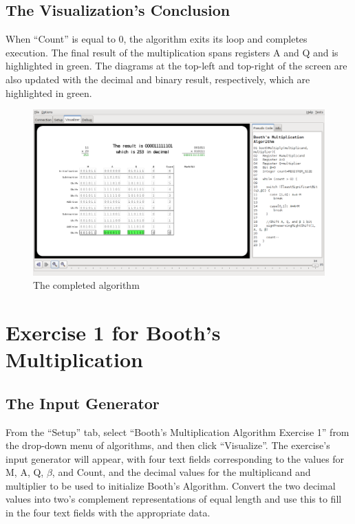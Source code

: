 \documentclass{article}
\begin{document}
\pagebreak

\subsection{The Visualization's Conclusion}
When ``Count'' is equal to 0, the algorithm exits its loop and completes execution.
The final result of the multiplication spans registers A and Q and is highlighted in green.
The diagrams at the top-left and top-right of the screen are also updated with the decimal and binary result, respectively, which are highlighted in green.

\begin{figure}[h]
\centering
\includegraphics[scale=0.3]{finish.pdf}
\caption{The completed algorithm}
\end{figure}

\pagebreak

\section{Exercise 1 for Booth's Multiplication}
\subsection{The Input Generator}
From the ``Setup'' tab, select ``Booth's Multiplication Algorithm Exercise 1'' from the drop-down menu of algorithms, and then click ``Visualize''.
The exercise's input generator will appear, with four text fields corresponding to the values for M, A, Q, $\beta$, and Count, and the decimal values for the multiplicand and multiplier to be used to initialize Booth's Algorithm.
Convert the two decimal values into two's complement representations of equal length and use this to fill in the four text fields with the appropriate data.
\end{document}
